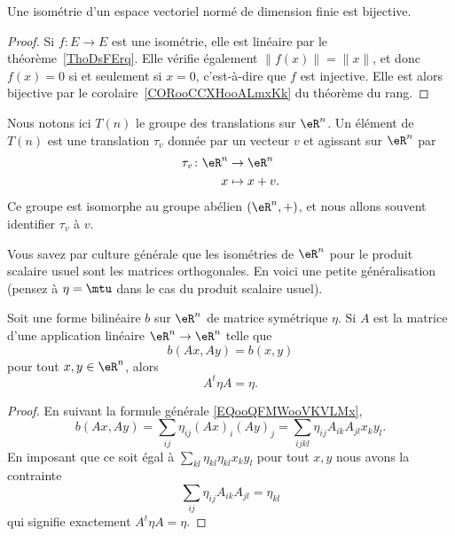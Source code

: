 \begin{lemma}        \label{LEMooJPYZooHETCqt}
    Une isométrie d'un espace vectoriel normé de dimension finie est bijective.
\end{lemma}

\begin{proof}
    Si \( f\colon E\to E\) est une isométrie, elle est linéaire par le théorème~\ref{ThoDsFErq}. Elle vérifie également \( \| f(x) \|=\| x \|\), et donc \( f(x)=0\) si et seulement si \( x=0\), c'est-à-dire que \( f\) est injective. Elle est alors bijective par le corolaire~\ref{CORooCCXHooALmxKk} du théorème du rang.
\end{proof}

Nous notons ici \( T(n)\) le groupe des translations sur \( \eR^n\). Un élément de \( T(n)\) est une translation \( \tau_v\) donnée par un vecteur \( v\) et agissant sur \( \eR^n\) par
\begin{equation}
    \begin{aligned}
        \tau_v\colon \eR^n&\to \eR^{n} \\
        x&\mapsto x+v.
    \end{aligned}
\end{equation}
Ce groupe est isomorphe au groupe abélien \( (\eR^n,+)\), et nous allons souvent identifier \( \tau_v\) à \( v\).

Vous savez par culture générale que les isométries de \( \eR^n\) pour le produit scalaire usuel sont les matrices orthogonales. En voici une petite généralisation (pensez à \( \eta=\mtu\) dans le cas du produit scalaire usuel).
\begin{proposition}     \label{PROPooSYQMooEnZFdp}
    Soit une forme bilinéaire \( b\) sur \( \eR^n\) de matrice symétrique \( \eta\). Si \( A\) est la matrice d'une application linéaire \( \eR^n\to \eR^n\) telle que
    \begin{equation}
        b(Ax,Ay)=b(x,y)
    \end{equation}
    pour tout \( x,y\in\eR^n\), alors
    \begin{equation}
        A^t\eta A=\eta.
    \end{equation}
\end{proposition}

\begin{proof}
    En suivant la formule générale \eqref{EQooQFMWooVKVLMx},
    \begin{equation}
            b(Ax,Ay)=\sum_{ij} \eta_{ij} (Ax)_i(Ay)_j=\sum_{ijkl}\eta_{ij}A_{ik}A_{jl}x_ky_l.
    \end{equation}
    En imposant que ce soit égal à \( \sum_{kl}\eta_{kl}\eta_{kl}x_ky_l\) pour tout \( x,y\) nous avons la contrainte
    \begin{equation}
        \sum_{ij}\eta_{ij}A_{ik}A_{jl}=\eta_{kl}
    \end{equation}
    qui signifie exactement \( A^t\eta A=\eta\).
\end{proof}

